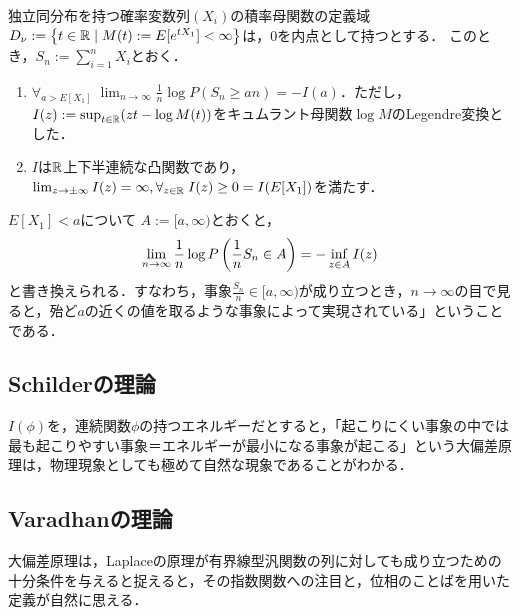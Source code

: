 \documentclass[uplatex,dvipdfmx]{jsreport}
\begin{document}
\begin{theorem}
    独立同分布を持つ確率変数列$(X_i)$の積率母関数の定義域$D_\nu:=\left\{t\in\mathbb{R}\mid M(t):=E[e^{tX_1}]<\infty\right\}$は，$0$を内点として持つとする．
    このとき，$S_n:=\sum_{i=1}^nX_i$とおく．
    \begin{enumerate}
        \item $\forall_{a>E[X_1]}\;\lim_{n\to\infty}\frac{1}{n}\log P(S_n\ge an)=-I(a)$．ただし，$I(z):=\sup_{t\in\mathbb{R}}(zt-\log M(t))$をキュムラント母関数$\log M$のLegendre変換とした．
        \item $I$は$\mathbb{R}$上下半連続な凸関数であり，$\lim_{z\to\pm\infty}I(z)=\infty,\forall_{z\in\mathbb{R}}\;I(z)\ge 0=I(E[X_1])$を満たす．
    \end{enumerate}
\end{theorem}
\begin{remarks}
    $E[X_1]<a$について
    $A:=[a,\infty)$とおくと，
    \[\lim_{n\to\infty}\frac{1}{n}\log P\left(\frac{1}{n}S_n\in A\right)=-\inf_{z\in A}I(z)\]
    と書き換えられる．すなわち，事象$\frac{S_n}{n}\in[a,\infty)$が成り立つとき，$n\to\infty$の目で見ると，殆ど$a$の近くの値を取るような事象によって実現されている」ということである．

\end{remarks}

\subsection{Schilderの理論}

\begin{tcolorbox}[colframe=ForestGreen, colback=ForestGreen!10!white,breakable,colbacktitle=ForestGreen!40!white,coltitle=black,fonttitle=\bfseries\sffamily,
title=確率過程に関する大偏差原理]
    $I(\phi)$を，連続関数$\phi$の持つエネルギーだとすると，「起こりにくい事象の中では最も起こりやすい事象＝エネルギーが最小になる事象が起こる」という大偏差原理は，物理現象としても極めて自然な現象であることがわかる．
\end{tcolorbox}

\subsection{Varadhanの理論}

\begin{tcolorbox}[colframe=ForestGreen, colback=ForestGreen!10!white,breakable,colbacktitle=ForestGreen!40!white,coltitle=black,fonttitle=\bfseries\sffamily,
title=]
    大偏差原理は，Laplaceの原理が有界線型汎関数の列に対しても成り立つための十分条件を与えると捉えると，その指数関数への注目と，位相のことばを用いた定義が自然に思える．
\end{tcolorbox}
\end{document}
